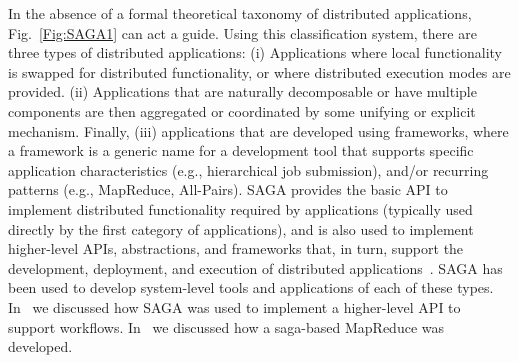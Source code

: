 \documentclass{rspublic}
\begin{document}
In the absence of a formal theoretical taxonomy of distributed
applications, Fig.~\ref{Fig:SAGA1} can act a guide. Using this
classification system, there are three types of distributed
applications: (i) Applications where local functionality is swapped
for distributed functionality, or where distributed execution modes
are provided. %
(ii) Applications that are naturally decomposable or have multiple
components are then aggregated or coordinated by some unifying or
explicit mechanism. %
Finally, (iii) applications that are developed using frameworks, where a
framework is a generic name for a development tool that supports
specific application characteristics (e.g., hierarchical job
submission), and/or recurring patterns (e.g., MapReduce, All-Pairs).
SAGA provides the basic API to implement distributed functionality
required by applications (typically used directly by the first category
of applications), and is also used to implement higher-level APIs,
abstractions, and frameworks that, in turn, support the development,
deployment, and execution of distributed
applications~\citep{saga_gmac09}. SAGA has been used to develop
system-level tools and applications of each of these types.
In~\cite{saga_montage_escience09} we discussed how SAGA was used to
implement a higher-level API to support workflows.
In~\cite{saga_ccgrid09} we discussed how a saga-based MapReduce was
developed.


\end{document}
